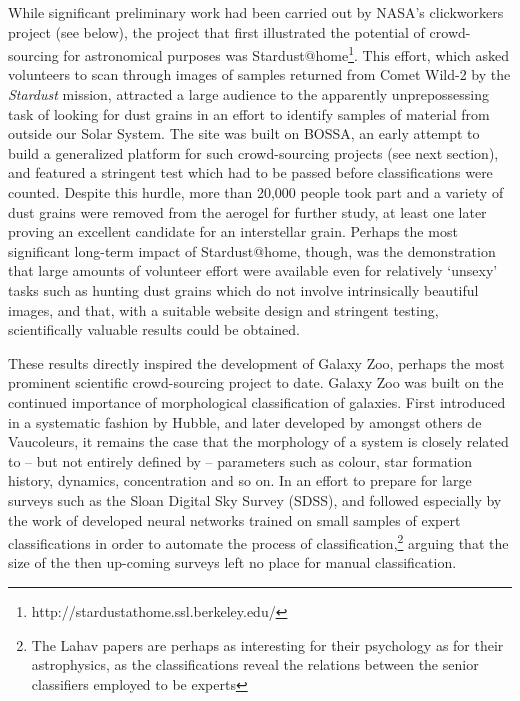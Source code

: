 \documentclass{ar2e}
\begin{document}
While significant preliminary work had been carried out by NASA's clickworkers
project (see below), the project that first illustrated the potential of
crowd-sourcing for astronomical purposes was Stardust@home\footnote{http://stardustathome.ssl.berkeley.edu/}. This effort, which
asked volunteers to scan through images of samples returned from Comet Wild-2
by the \emph{Stardust} mission, attracted a large audience to the apparently
unprepossessing task of looking for dust grains in an effort to identify
samples of material from outside our Solar System. The site was built on
BOSSA, an early attempt to build a generalized platform for such crowd-sourcing
projects (see next section), and featured a stringent test which had to be
passed before classifications were counted. Despite this hurdle, more than
20,000 people took part and a variety of dust grains were removed from the
aerogel for further study, at least one later proving an excellent candidate
for an interstellar grain. Perhaps the most significant long-term impact of
Stardust@home, though, was the demonstration that large amounts of volunteer
effort were available even for relatively `unsexy' tasks such as hunting dust
grains which do not involve intrinsically beautiful images, and that, with a
suitable website design and stringent testing, scientifically valuable results
could be obtained. 


These results directly inspired the development of Galaxy Zoo, perhaps the most
prominent scientific crowd-sourcing project to date. Galaxy Zoo was built on the
continued importance of morphological classification of galaxies. First
introduced in a systematic fashion by Hubble, and later developed by amongst
others de Vaucoleurs, it remains the case that the morphology of a system is
closely related to -- but not entirely defined by -- parameters such as colour,
star formation history, dynamics, concentration and so on.  In an effort to
prepare for large surveys such as the Sloan Digital Sky Survey (SDSS), \citet{Lahav1995} and \citet{Lahav1996} followed especially by the work of \citet{Ball} developed neural networks
trained on small samples of expert classifications in order to automate the
process of classification,\footnote{The Lahav papers are perhaps as interesting
for their psychology as for their astrophysics, as the classifications reveal
the relations between the senior classifiers employed to be experts} arguing
that the size of the then up-coming surveys left no place for manual
classification.
\end{document}
